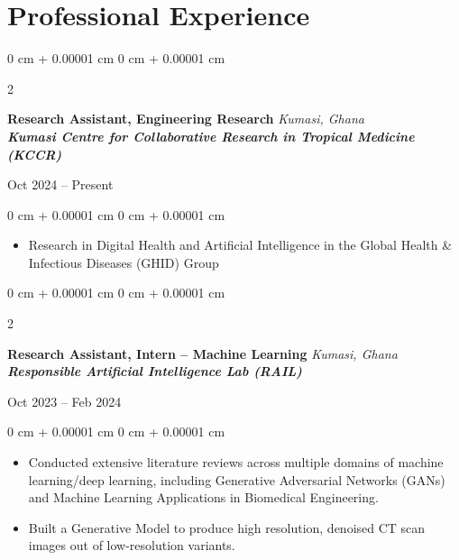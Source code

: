 \documentclass[10pt, letterpaper]{article}
\newenvironment{highlights}{
    \begin{itemize}[
        topsep=0.10 cm,
        parsep=0.10 cm,
        partopsep=0pt,
        itemsep=0pt,
        leftmargin=0 cm + 10pt
    ]
}{
    \end{itemize}
} %
\newenvironment{onecolentry}{
    \begin{adjustwidth}{
        0 cm + 0.00001 cm
    }{
        0 cm + 0.00001 cm
    }
}{
    \end{adjustwidth}
} %
\newenvironment{twocolentry}[2][]{
    \onecolentry
    \def\secondColumn{#2}
    \setcolumnwidth{\fill, 4.5 cm}
    \begin{paracol}{2}
}{
    \switchcolumn \raggedleft \secondColumn
    \end{paracol}
    \endonecolentry
} %
\begin{document}
    \section{Professional Experience}

    \begin{twocolentry}{
        Oct 2024 – Present
    }
        \textbf{Research Assistant, Engineering Research} \hfill \textit{Kumasi, Ghana}\\
        \textbf{\textit{Kumasi Centre for Collaborative Research in Tropical Medicine (KCCR)}}
    \end{twocolentry}

    \vspace{0.10 cm}
    \begin{onecolentry}
        \begin{highlights}
            \item Research in Digital Health and Artificial Intelligence in the Global Health \& Infectious Diseases (GHID) Group
        \end{highlights}
    \end{onecolentry}

    \vspace{0.2 cm}

    \begin{twocolentry}{
        Oct 2023 – Feb 2024
    }
        \textbf{Research Assistant, Intern – Machine Learning} \hfill \textit{Kumasi, Ghana}\\
        \textbf{\textit{Responsible Artificial Intelligence Lab (RAIL)}}
    \end{twocolentry}

    \vspace{0.10 cm}
    \begin{onecolentry}
        \begin{highlights}
            \item Conducted extensive literature reviews across multiple domains of machine learning/deep learning, including Generative Adversarial Networks (GANs) and Machine Learning Applications in Biomedical Engineering.
            \item Built a Generative Model to produce high resolution, denoised CT scan images out of low-resolution variants.
        \end{highlights}
    \end{onecolentry}

    \vspace{0.2 cm}
\end{document}
